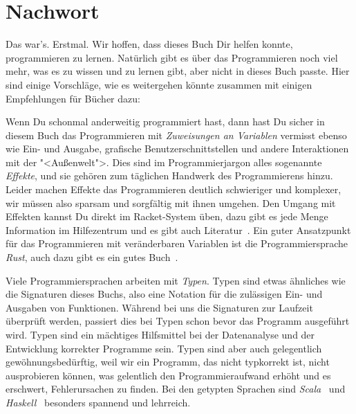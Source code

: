 
\chapter*{Nachwort}
\label{chap:nachwort}

Das war's.  Erstmal.  Wir hoffen, dass dieses Buch Dir helfen konnte,
programmieren zu lernen.  Natürlich gibt es über das Programmieren
noch viel mehr, was es zu wissen und zu lernen gibt, aber nicht in
dieses Buch passte.  Hier sind einige Vorschläge, wie es weitergehen
könnte zusammen mit einigen Empfehlungen für Bücher dazu:

Wenn Du schonmal anderweitig programmiert hast, dann hast Du
  sicher in diesem Buch das Programmieren mit \emph{Zuweisungen an Variablen}
  vermisst ebenso wie Ein- und Ausgabe, grafische
  Benutzerschnittstellen und andere Interaktionen mit der
  "<Außenwelt">.  Dies sind im Programmierjargon alles sogenannte
  \textit{Effekte}, und sie gehören zum täglichen
  Handwerk des Programmierens hinzu.  Leider machen Effekte das
  Programmieren deutlich schwieriger und komplexer, wir müssen also
  sparsam und sorgfältig mit ihnen umgehen. Den Umgang mit Effekten
  kannst Du direkt im Racket-System üben, dazu gibt es jede Menge
  Information im Hilfezentrum und es gibt auch
  Literatur~\cite{FelleisenEtAll2013}.  Ein guter Ansatzpunkt für das
  Programmieren mit veränderbaren Variablen ist die Programmiersprache
  \textit{Rust}, auch dazu gibt es ein gutes
  Buch~\cite{KlabnikNichols2018}.

Viele Programmiersprachen arbeiten mit
  \textit{Typen}.  Typen sind etwas ähnliches wie die
  Signaturen dieses Buchs, also eine Notation für die zulässigen Ein-
  und Ausgaben von Funktionen.  Während bei uns die Signaturen zur
  Laufzeit überprüft werden, passiert dies bei Typen schon bevor das
  Programm ausgeführt wird.  Typen sind ein mächtiges Hilfsmittel bei
  der Datenanalyse und der Entwicklung korrekter Programme sein.
  Typen sind aber auch gelegentlich gewöhnungsbedürftig, weil wir
  ein Programm, das nicht typkorrekt ist, nicht ausprobieren können,
  was gelentlich den Programmieraufwand erhöht und es erschwert,
  Fehlerursachen zu finden.  Bei den getypten Sprachen sind
  \textit{Scala}~\cite{ChiusanoBjarnason2014} und
  \textit{Haskell}~\cite{Hutton2016} besonders spannend und
  lehrreich.

